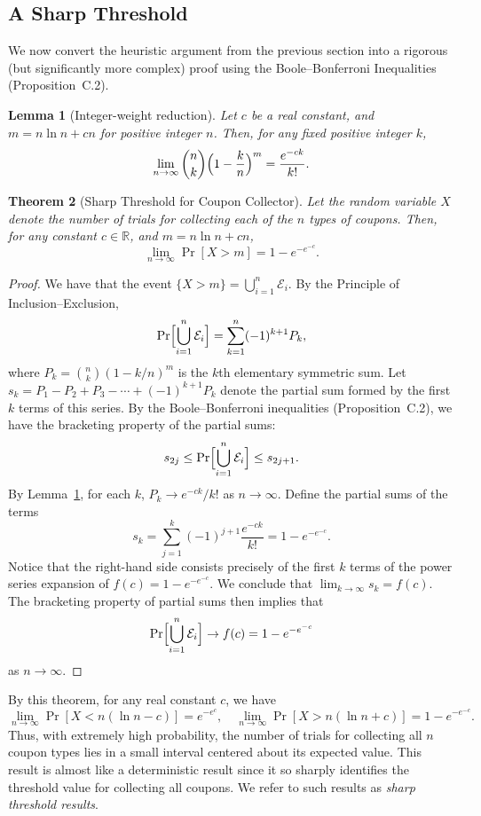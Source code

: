 \documentclass[twoside,12pt]{book}
\theoremstyle{plain}
\newtheorem{theorem}{Theorem}[chapter]
\newtheorem{lemma}[theorem]{Lemma}
\theoremstyle{definition}
\theoremstyle{remark}
\begin{document}
\subsection{A Sharp Threshold}

We now convert the heuristic argument from the previous section into a rigorous (but significantly more complex) proof using the Boole--Bonferroni Inequalities (Proposition~C.2).

\begin{lemma}[Integer-weight reduction]
\label{lem:coupon-tech}
Let $c$ be a real constant, and $m = n \ln n + cn$ for positive integer $n$. Then, for any fixed positive integer $k$,
\[
\lim_{n \to \infty} \binom{n}{k}\Bigl(1 - \frac{k}{n}\Bigr)^m = \frac{e^{-ck}}{k!}.
\]
\end{lemma}

\begin{theorem}[Sharp Threshold for Coupon Collector]
\label{thm:coupon-sharp}
Let the random variable $X$ denote the number of trials for collecting each of the $n$ types of coupons. Then, for any constant $c \in \mathbb{R}$, and $m = n \ln n + cn$,
\[
\lim_{n \to \infty} \Pr[X > m] = 1 - e^{-e^{-c}}.
\]
\end{theorem}

\begin{proof}
We have that the event $\{X > m\} = \bigcup_{i=1}^{n} \mathcal{E}_i$. By the Principle of Inclusion--Exclusion,
\[
\Pr\Bigl[\bigcup_{i=1}^{n} \mathcal{E}_i\Bigr] = \sum_{k=1}^{n} (-1)^{k+1} P_k,
\]
where $P_k = \binom{n}{k} (1 - k/n)^m$ is the $k$th elementary symmetric sum. Let $s_k = P_1 - P_2 + P_3 - \cdots + (-1)^{k+1} P_k$ denote the partial sum formed by the first $k$ terms of this series. By the Boole--Bonferroni inequalities (Proposition~C.2), we have the bracketing property of the partial sums:
\[
s_{2j} \leq \Pr\Bigl[\bigcup_{i=1}^{n} \mathcal{E}_i\Bigr] \leq s_{2j+1}.
\]
By Lemma~\ref{lem:coupon-tech}, for each $k$, $P_k \to e^{-ck}/k!$ as $n \to \infty$. Define the partial sums of the terms
\[
s_k = \sum_{j=1}^{k} (-1)^{j+1} \frac{e^{-ck}}{k!} = 1 - e^{-e^{-c}}.
\]
Notice that the right-hand side consists precisely of the first $k$ terms of the power series expansion of $f(c) = 1 - e^{-e^{-c}}$. We conclude that $\lim_{k \to \infty} s_k = f(c)$. The bracketing property of partial sums then implies that
\[
\Pr\Bigl[\bigcup_{i=1}^{n} \mathcal{E}_i\Bigr] \to f(c) = 1 - e^{-e^{-c}}
\]
as $n \to \infty$.
\end{proof}

By this theorem, for any real constant $c$, we have
\[
\lim_{n \to \infty} \Pr[X < n(\ln n - c)] = e^{-e^c}, \quad
\lim_{n \to \infty} \Pr[X > n(\ln n + c)] = 1 - e^{-e^{-c}}.
\]
Thus, with extremely high probability, the number of trials for collecting all $n$ coupon types lies in a small interval centered about its expected value. This result is almost like a deterministic result since it so sharply identifies the threshold value for collecting all coupons. We refer to such results as \emph{sharp threshold results}.
\end{document}
